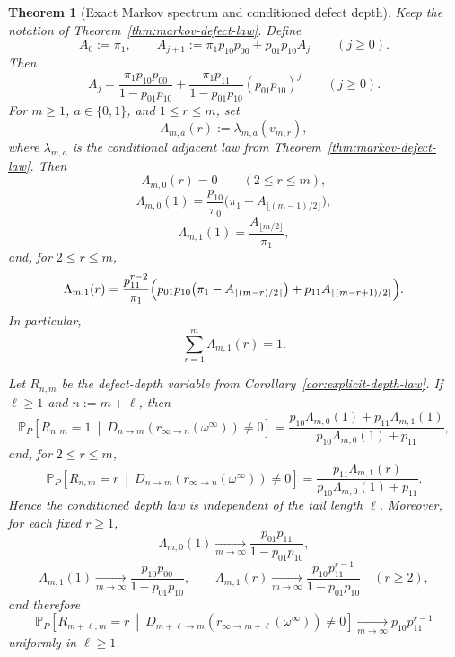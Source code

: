 \documentclass[11pt,reqno]{amsart}
\numberwithin{equation}{section}
\theoremstyle{plain}
\newtheorem{theorem}{Theorem}[section]
\theoremstyle{definition}
\theoremstyle{remark}
\newcommand{\PP}{\mathbb{P}}
\begin{document}
\begin{theorem}[Exact Markov spectrum and conditioned defect depth]
\label{thm:markov-spectrum}
Keep the notation of Theorem~\ref{thm:markov-defect-law}.  Define
\[
A_0:=\pi_1,
\qquad
A_{j+1}:=\pi_1p_{10}p_{00}+p_{01}p_{10}A_j
\qquad (j\ge 0).
\]
Then
\[
A_j
=
\frac{\pi_1p_{10}p_{00}}{1-p_{01}p_{10}}
+
\frac{\pi_1p_{11}}{1-p_{01}p_{10}}(p_{01}p_{10})^j
\qquad (j\ge 0).
\]
For $m\ge 1$, $a\in\{0,1\}$, and $1\le r\le m$, set
\[
\Lambda_{m,a}(r):=\lambda_{m,a}(v_{m,r}),
\]
where $\lambda_{m,a}$ is the conditional adjacent law from
Theorem~\ref{thm:markov-defect-law}.  Then
\[
\Lambda_{m,0}(r)=0
\qquad (2\le r\le m),
\]
\[
\Lambda_{m,0}(1)
=
\frac{p_{10}}{\pi_0}
\bigl(
\pi_1-A_{\lfloor (m-1)/2\rfloor}
\bigr),
\]
\[
\Lambda_{m,1}(1)
=
\frac{A_{\lfloor m/2\rfloor}}{\pi_1},
\]
and, for $2\le r\le m$,
\[
\Lambda_{m,1}(r)
=
\frac{p_{11}^{r-2}}{\pi_1}
\Bigl(
p_{01}p_{10}\bigl(\pi_1-A_{\lfloor (m-r)/2\rfloor}\bigr)
+
p_{11}A_{\lfloor (m-r+1)/2\rfloor}
\Bigr).
\]
In particular,
\[
\sum_{r=1}^m\Lambda_{m,1}(r)=1.
\]

Let $R_{n,m}$ be the defect-depth variable from
Corollary~\ref{cor:explicit-depth-law}.  If $\ell\ge 1$ and $n:=m+\ell$, then
\[
\PP_P\!\left[
R_{n,m}=1
\ \middle|\
D_{n\to m}(r_{\infty\to n}(\omega^\infty))\ne 0
\right]
=
\frac{p_{10}\Lambda_{m,0}(1)+p_{11}\Lambda_{m,1}(1)}
{p_{10}\Lambda_{m,0}(1)+p_{11}},
\]
and, for $2\le r\le m$,
\[
\PP_P\!\left[
R_{n,m}=r
\ \middle|\
D_{n\to m}(r_{\infty\to n}(\omega^\infty))\ne 0
\right]
=
\frac{p_{11}\Lambda_{m,1}(r)}
{p_{10}\Lambda_{m,0}(1)+p_{11}}.
\]
Hence the conditioned depth law is independent of the tail length $\ell$.
Moreover, for each fixed $r\ge 1$,
\[
\Lambda_{m,0}(1)\xrightarrow[m\to\infty]{}
\frac{p_{01}p_{11}}{1-p_{01}p_{10}},
\]
\[
\Lambda_{m,1}(1)\xrightarrow[m\to\infty]{}
\frac{p_{10}p_{00}}{1-p_{01}p_{10}},
\qquad
\Lambda_{m,1}(r)\xrightarrow[m\to\infty]{}
\frac{p_{10}p_{11}^{r-1}}{1-p_{01}p_{10}}
\quad (r\ge 2),
\]
and therefore
\[
\PP_P\!\left[
R_{m+\ell,m}=r
\ \middle|\
D_{m+\ell\to m}(r_{\infty\to m+\ell}(\omega^\infty))\ne 0
\right]
\xrightarrow[m\to\infty]{}
p_{10}p_{11}^{r-1}
\]
uniformly in $\ell\ge 1$.
\end{theorem}
\end{document}
